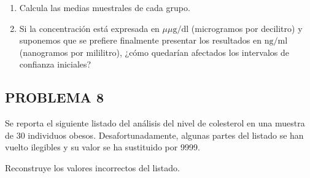 \documentclass[
]{article}
\newenvironment{Shaded}{\begin{snugshade}}{\end{snugshade}}
\newcommand{\DecValTok}[1]{\textcolor[rgb]{0.00,0.00,0.81}{#1}}
\newcommand{\ErrorTok}[1]{\textcolor[rgb]{0.64,0.00,0.00}{\textbf{#1}}}
\newcommand{\FloatTok}[1]{\textcolor[rgb]{0.00,0.00,0.81}{#1}}
\newcommand{\NormalTok}[1]{#1}
\newcommand{\SpecialCharTok}[1]{\textcolor[rgb]{0.81,0.36,0.00}{\textbf{#1}}}
\providecommand{\tightlist}{%
  \setlength{\itemsep}{0pt}\setlength{\parskip}{0pt}}
\begin{document}
\begin{enumerate}
\def\labelenumi{\alph{enumi})}
\tightlist
\item
  Calcula las medias muestrales de cada grupo.\\
\item
  Si la concentración está expresada en \(\mu \mu \mathrm{g} / \mathrm{dl}\) (microgramos por decilitro) y suponemos que se prefiere finalmente presentar los resultados en \(\mathrm{ng} / \mathrm{ml}\) (nanogramos por mililitro), ¿cómo quedarían afectados los intervalos de confianza iniciales?
\end{enumerate}

\subsection{PROBLEMA 8}\label{problema-8}

Se reporta el siguiente listado del análisis del nivel de colesterol en una muestra de 30 individuos obesos. Desafortunadamente, algunas partes del listado se han vuelto ilegibles y su valor se ha sustituido por 9999.

\begin{Shaded}
\end{Shaded}

Reconstruye los valores incorrectos del listado.
\end{document}
